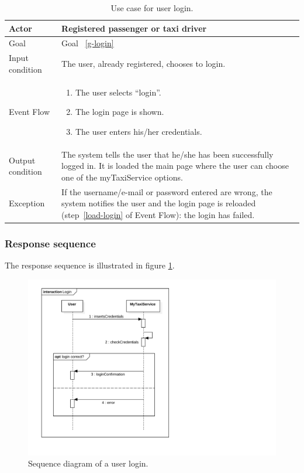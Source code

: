 \begin{table}
\begin{center}
\begin{tabular}{| l | p{} |}
\hline
Actor & Registered passenger or taxi driver \\
\hline
Goal & Goal ~\ref{g-login}
\\
\hline
Input condition & The user, already registered, chooses to login.  \\
\hline
Event Flow & \begin{enumerate}
	\item The user selects ``login''.
	\item The login page is shown. \label{load-login}
	\item The user enters his/her credentials.
	\end{enumerate}
\\
\hline
Output condition & The system tells the user that he/she has been successfully logged in.
It is loaded the main page where the user can choose one of the myTaxiService options. \\
\hline

Exception & If the username/e-mail or password entered are wrong, the system notifies the user and the login page is reloaded (step~\ref{load-login} of Event Flow): the login has failed. 

	
 \\
\hline
\end{tabular}
\end{center}
\caption{Use case for user login.}
\label{usecase-login}
\end{table}





\subsubsection{Response sequence}
The response sequence is illustrated in figure \ref{fig:sequence-login}.
\begin{figure}
\includegraphics[width=\textwidth]{diagrams/sequence_login.pdf}
\caption{Sequence diagram of a user login.}
\label{fig:sequence-login}
\end{figure}

